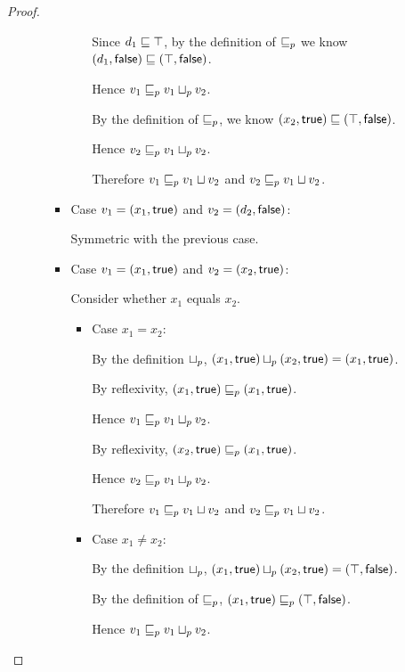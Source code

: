 \begin{proof}
\begin{enumerate}
\begin{enumerate}
\begin{itemize}
\begin{itemize}
          Since $d_1 \sqsubseteq \top$, by the definition of $\sqsubseteq_p$ we
          know $(d_1, \textsf{false}) \sqsubseteq
          (\top, \textsf{false})$.

          Hence $v_1 \sqsubseteq_p v_1 \sqcup_p v_2$.

          By the definition of $\sqsubseteq_p$, we know
          $(x_2, \textsf{true}) \sqsubseteq
          (\top, \textsf{false})$.

          Hence $v_2 \sqsubseteq_p v_1 \sqcup_p v_2$.

          Therefore $v_1 \sqsubseteq_p v_1  \sqcup  v_2$ and $v_2 \sqsubseteq_p
          v_1  \sqcup  v_2$.
        \end{itemize}
      \item Case $v_1 = (x_1, \textsf{true})$ and $v_2 =
        (d_2, \textsf{false})$:

        Symmetric with the previous case. 
      \item Case $v_1 = (x_1, \textsf{true})$ and $v_2 =
        (x_2, \textsf{true})$:

        Consider whether $x_1$ equals $x_2$. 
        \begin{itemize}
        \item Case $x_1 = x_2$:
          
          By the definition $ \sqcup_p $, $(x_1, \textsf{true})
           \sqcup_p  (x_2, \textsf{true}) =
          (x_1, \textsf{true})$.
 
          By reflexivity, $(x_1, \textsf{true}) \sqsubseteq_p
          (x_1, \textsf{true})$.

          Hence $v_1 \sqsubseteq_p v_1 \sqcup_p v_2$.

          By reflexivity, $(x_2, \textsf{true}) \sqsubseteq_p
          (x_1, \textsf{true})$.

          Hence $v_2 \sqsubseteq_p v_1 \sqcup_p v_2$.

          Therefore $v_1 \sqsubseteq_p v_1  \sqcup  v_2$ and $v_2 \sqsubseteq_p
          v_1  \sqcup  v_2$.

        \item Case $x_1 \not= x_2$: 

          By the definition $ \sqcup_p $, $(x_1, \textsf{true})
           \sqcup_p  (x_2, \textsf{true}) =
          (\top, \textsf{false})$.

          By the definition of $\sqsubseteq_p$, $(x_1, \textsf{true})
          \sqsubseteq_p (\top, \textsf{false})$.

          Hence $v_1 \sqsubseteq_p v_1 \sqcup_p v_2$.


\end{itemize}
\end{itemize}
\end{enumerate}
\end{enumerate}
\end{proof}
